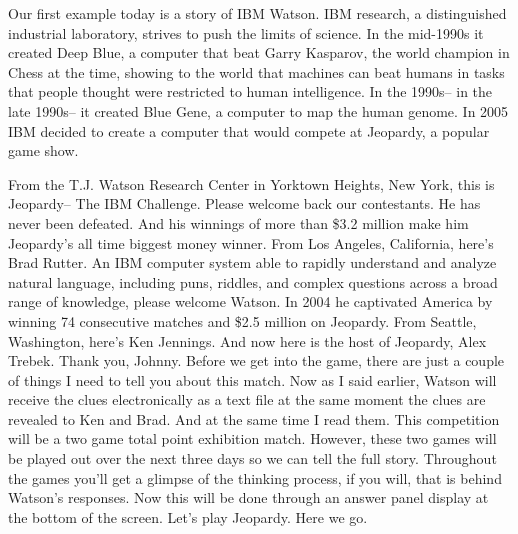 
Our first example today is a story of IBM Watson.
IBM research, a distinguished industrial laboratory,
strives to push the limits of science.
In the mid-1990s it created Deep Blue, a computer that
beat Garry Kasparov, the world champion in Chess at the time,
showing to the world that machines can beat humans
in tasks that people thought were
restricted to human intelligence.
In the 1990s-- in the late 1990s--
it created Blue Gene, a computer to map the human genome.
In 2005 IBM decided to create a computer that
would compete at Jeopardy, a popular game show.

From the T.J. Watson Research Center
in Yorktown Heights, New York, this
is Jeopardy-- The IBM Challenge.
Please welcome back our contestants.
He has never been defeated.
And his winnings of more than \$3.2 million
make him Jeopardy's all time biggest money winner.
From Los Angeles, California, here's Brad Rutter.
An IBM computer system able to rapidly understand and analyze
natural language, including puns, riddles,
and complex questions across a broad range of knowledge,
please welcome Watson.
In 2004 he captivated America by winning 74 consecutive matches
and \$2.5 million on Jeopardy.
From Seattle, Washington, here's Ken Jennings.
And now here is the host of Jeopardy, Alex Trebek.
Thank you, Johnny.
Before we get into the game, there
are just a couple of things I need
to tell you about this match.
Now as I said earlier, Watson will receive the clues
electronically as a text file at the same moment the clues are
revealed to Ken and Brad.
And at the same time I read them.
This competition will be a two game
total point exhibition match.
However, these two games will be played out over the next three
days so we can tell the full story.
Throughout the games you'll get a glimpse of the thinking
process, if you will, that is behind Watson's responses.
Now this will be done through an answer panel display
at the bottom of the screen.
Let's play Jeopardy.
Here we go.

